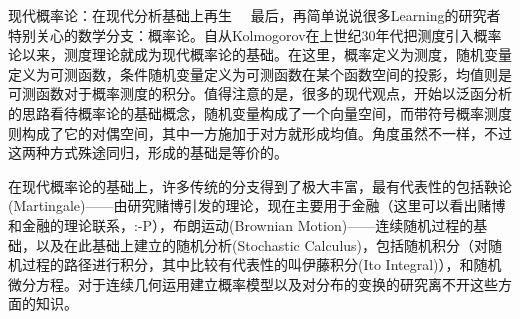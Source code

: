  

现代概率论：在现代分析基础上再生　
最后，再简单说说很多Learning的研究者特别关心的数学分支：概率论。自从Kolmogorov在上世纪30年代把测度引入概率论以来，测度理论就成为现代概率论的基础。在这里，概率定义为测度，随机变量定义为可测函数，条件随机变量定义为可测函数在某个函数空间的投影，均值则是可测函数对于概率测度的积分。值得注意的是，很多的现代观点，开始以泛函分析的思路看待概率论的基础概念，随机变量构成了一个向量空间，而带符号概率测度则构成了它的对偶空间，其中一方施加于对方就形成均值。角度虽然不一样，不过这两种方式殊途同归，形成的基础是等价的。

在现代概率论的基础上，许多传统的分支得到了极大丰富，最有代表性的包括鞅论(Martingale)——由研究赌博引发的理论，现在主要用于金融（这里可以看出赌博和金融的理论联系，:-P），布朗运动(Brownian Motion)——连续随机过程的基础，以及在此基础上建立的随机分析(Stochastic Calculus)，包括随机积分（对随机过程的路径进行积分，其中比较有代表性的叫伊藤积分(Ito Integral)），和随机微分方程。对于连续几何运用建立概率模型以及对分布的变换的研究离不开这些方面的知识。